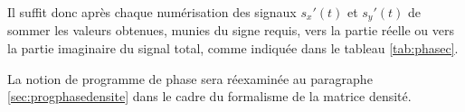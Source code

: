 Il suffit donc après chaque numérisation des signaux $s_x'(t)$ et $s_y'(t)$ de sommer les 
valeurs obtenues, munies du signe requis, vers la partie réelle ou vers la partie 
imaginaire du signal total, comme indiquée dans le tableau \ref{tab:phasec}.

La notion de programme de phase sera réexaminée au paragraphe \ref{sec:progphasedensite} 
dans le cadre du formalisme de la matrice densité.

